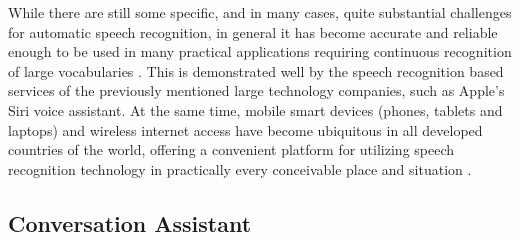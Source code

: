 \documentclass[english, 12pt, a4paper, pdftex, elec, utf8]{aaltothesis}
\begin{document}
While there are still some specific, and in many cases, quite substantial challenges for automatic speech recognition, in general it has become accurate and reliable enough to be used in many practical applications requiring continuous recognition of large vocabularies \cite{yu2014automatic, keronen2014approaching, mcgraw2016personalized}. This is demonstrated well by the speech recognition based services of the previously mentioned large technology companies, such as Apple's Siri voice assistant. At the same time, mobile smart devices (phones, tablets and laptops) and  wireless internet access have become ubiquitous in all developed countries of the world, offering a convenient platform for utilizing speech recognition technology in practically every conceivable place and situation \cite{yu2014automatic, mcgraw2016personalized}.

\subsection{Conversation Assistant}
\end{document}
